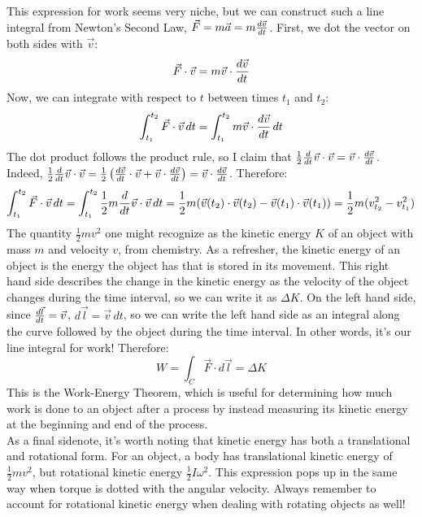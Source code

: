 This expression for work seems very niche, but we can construct such a line integral from Newton's Second Law, $\vec F = m\vec a = m \frac{d \vec v}{d t}$. First, we dot the vector on both sides with $\vec v$:
\[
	\vec F \cdot \vec v = m \vec v \cdot \frac{d \vec v}{d t}
\]
Now, we can integrate with respect to $t$ between times $t_1$ and $t_2$:
\[
	\int_{t_1}^{t_2} \vec F \cdot \vec v \, dt = \int_{t_1}^{t_2} m \vec v \cdot \frac{d \vec v}{d t} \, dt
\]
The dot product follows the product rule, so I claim that $\frac{1}{2} \frac{d }{d t}\vec v \cdot \vec v = \vec v \cdot \frac{d \vec v}{d t}$. Indeed, $\frac{1}{2} \frac{d }{d t}\vec v \cdot \vec v = \frac{1}{2} \left( \frac{d \vec v}{d t} \cdot \vec v + \vec v \cdot \frac{d \vec v}{d t} \right) = \vec v \cdot \frac{d \vec v}{d t}$. Therefore:
\[
	\int_{t_1}^{t_2} \vec F \cdot \vec v \, dt = \int_{t_1}^{t_2} \frac{1}{2} m \frac{d }{d t}\vec v \cdot \vec v \, dt = \frac{1}{2} m (\vec v(t_2) \cdot \vec v(t_2) - \vec v(t_1) \cdot \vec v(t_1)) = \frac{1}{2}m (v_{t_2}^2 - v_{t_1}^2 )
\]
The quantity $\frac{1}{2} mv^2$ one might recognize as the kinetic energy $K$ of an object with mass $m$ and velocity $v$, from chemistry. As a refresher, the kinetic energy of an object is the energy the object has that is stored in its movement. This right hand side describes the change in the kinetic energy as the velocity of the object changes during the time interval, so we can write it as $\Delta K$. On the left hand side, since $\frac{d \vec l}{d t} = \vec v$, $d\vec l = \vec v \, dt$, so we can write the left hand side as an integral along the curve followed by the object during the time interval. In other words, it's our line integral for work! Therefore:
\[
	W = \int_C \vec F \cdot d\vec l = \Delta K
\]
This is the Work-Energy Theorem, which is useful for determining how much work is done to an object after a process by instead measuring its kinetic energy at the beginning and end of the process. \\
As a final sidenote, it's worth noting that kinetic energy has both a translational and rotational form. For an object, a body has translational kinetic energy of $\frac{1}{2}mv^2$, but rotational kinetic energy $\frac{1}{2}I\omega^2$. This expression pops up in the same way when torque is dotted with the angular velocity. Always remember to account for rotational kinetic energy when dealing with rotating objects as well!

